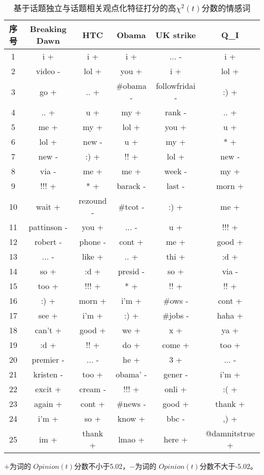 \begin{table}[htp]
 \centering
  \caption{ 基于话题独立与话题相关观点化特征打分的高$\chi^{2}(t)$分数的情感词}
  \label{Terms}
  \begin{tabular}{|cc cccc|}
 \hline
序号	&	Breaking Dawn		&	HTC		&	Obama 		&	UK strike		&	Q\_I\\	
 \hline
1	&	i	+	&	i	+	&	i	+	&	...	-	&	i	+	\\
2	&	video	-	&	lol	+	&	you	+	&	i	+	&	lol	+	\\
3	&	go	+	&	..	+	&	\#obama	-	&	followfridai	-	&	:)	+	\\
4	&	..	+	&	u	+	&	my	+	&	rank	-	&	..	+	\\
5	&	me	+	&	my	+	&	lol	+	&	you	+	&	u	+	\\
6	&	lol	+	&	new	-	&	u	+	&	my	+	&	*	+	\\
7	&	new	-	&	:)	+	&	!!	+	&	lol	+	&	new	-	\\
8	&	via	-	&	me	+	&	me	+	&	week	-	&	my	+	\\
9	&	!!!	+	&	*	+	&	barack	-	&	last	-	&	morn	+	\\
10	&	wait	+	&	rezound	-	&	\#tcot	-	&	:)	+	&	me	+	\\
11	&	pattinson	-	&	you	+	&	...	-	&	u	+	&	!!!	+	\\
12	&	robert	-	&	phone	-	&	cont	+	&	me	+	&	good	+	\\
13	&	...	-	&	like	+	&	..	+	&	thi	+	&	:d	+	\\
14	&	so	+	&	:d	+	&	presid	-	&	so	+	&	via	-	\\
15	&	too	+	&	!!!	+	&	*	+	&	!!	+	&	!!	+	\\
16	&	:)	+	&	morn	+	&	i'm	+	&	\#ows	-	&	cont	+	\\
17	&	see	+	&	i'm	+	&	:)	+	&	\#jobs	-	&	haha	+	\\
18	&	can't	+	&	good	+	&	we	+	&	x	+	&	ya	+	\\
19	&	:d	+	&	!!	+	&	do	+	&	come	+	&	too	+	\\
20	&	premier	-	&	...	-	&	he	+	&	3	+	&	...	-	\\
21	&	kristen	-	&	too	+	&	obama'	-	&	gener	-	&	i'm	+	\\
22	&	excit	+	&	cream	-	&	!!!	+	&	onli	+	&	:(	+	\\
23	&	again	+	&	cont	+	&	\#news	-	&	good	+	&	thank	+	\\
24	&	i'm	+	&	so	+	&	know	+	&	bbc	-	&	,)	+	\\
25	&	im	+	&	thank	+	&	lmao	+	&	here	+	&	@damnitstrue	+	\\
\hline
 \end{tabular}
   \begin{tablenotes}
        \footnotesize
\item $+$为词的 $Opinion(t)$分数不小于5.02，$-$为词的 $Opinion(t)$分数不大于-5.02。
\end{tablenotes}
\end{table}

